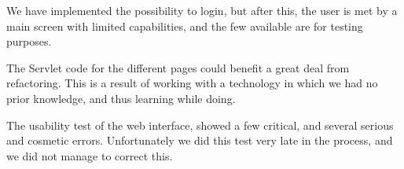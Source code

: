 We have implemented the possibility to login, but after this, the user is met by a main screen with limited capabilities, and the few available are for testing purposes.

The Servlet code for the different pages could benefit a great deal from refactoring. This is a result of working with a technology in which we had no prior knowledge, and thus learning while doing.

The usability test of the web interface, showed a few critical, and several serious and cosmetic errors. Unfortunately we did this test very late in the process, and we did not manage to correct this.
	

